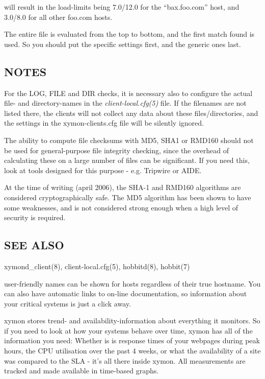  will result in the load-limits being 7.0/12.0 for the
  ``bax.foo.com'' host, and 3.0/8.0 for all other foo.com hosts. 

  The entire file is evaluated from the top to bottom, and the first
  match found is used. So you should put the specific settings first,
  and the generic ones last. 
 
\subsection{NOTES}
 For the LOG, FILE and DIR checks, it is necessary also to configure
 the actual file- and directory-names in the
 \emph{client-local.cfg(5)} file. If the filenames are not listed
 there, the clients will not collect any data about these
 files/directories, and the settings in the xymon-clients.cfg file
 will be silently ignored. 


  The ability to compute file checksums with MD5, SHA1 or RMD160
  should not be used for general-purpose file integrity checking,
  since the overhead of calculating these on a large number of files
  can be significant. If you need this, look at tools designed for
  this purpose - e.g. Tripwire or AIDE. 



  At the time of writing (april 2006), the SHA-1 and RMD160 algorithms
  are considered cryptographically safe. The MD5 algorithm has been
  shown to have some weaknesses, and is not considered strong enough
  when a high level of security is required. 



\subsection{SEE ALSO}
xymond\_client(8), client-local.cfg(5), hobbitd(8), hobbit(7) 

 
  user-friendly names can be shown for hosts regardless of their true
  hostname. You can also have automatic links to on-line
  documentation, so information about your critical systems is just a
  click away. 

\item[Integrated trend analysis, historical data and SLA reporting]
  xymon stores trend- and availability-information about everything
  it monitors. So if you need to look at how your systems behave over
  time, xymon has all of the information you need: Whether is is
  response times of your webpages during peak hours, the CPU
  utilisation over the past 4 weeks, or what the availability of a
  site was compared to the SLA - it's all there inside xymon. All
  measurements are tracked and made available in time-based graphs. 


